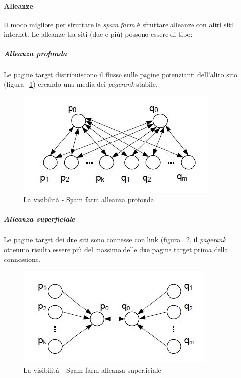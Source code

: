 				\paragraph{Alleanze}
					Il modo migliore per sfruttare le \emph{spam farm} è sfruttare alleanze con altri siti internet. Le alleanze tra siti (due e più) possono essere di tipo:
					\subparagraph{Alleanza profonda}
						Le pagine target distribuiscono il flusso sulle pagine potenzianti dell'altro sito (figura ~\ref{fig:LaVisibilita-SpamFarm2}) creando una media dei \emph{pagerank} stabile.
						
					\begin{figure} [h]
						\centering
						\includegraphics[scale=1]{images/LaVisibilita-SpamFarm2}
						\caption{La visibilità - Spam farm alleanza profonda}
						\label{fig:LaVisibilita-SpamFarm2}
					\end{figure}
						
					\subparagraph{Alleanza superficiale}
						Le pagine target dei due siti sono connesse con link (figura ~\ref{fig:LaVisibilita-SpamFarm3}, il \emph{pagerank} ottenuto risulta essere più del massimo delle due pagine target prima della connessione.
					
				\begin{figure} [h]
					\centering
					\includegraphics[scale=1]{images/LaVisibilita-SpamFarm3}
					\caption{La visibilità - Spam farm alleanza superficiale}
					\label{fig:LaVisibilita-SpamFarm3}
				\end{figure}
				
